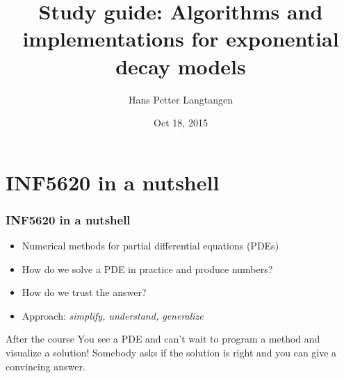 \documentclass{beamer}
\begin{document}








\title{Study guide: Algorithms and implementations for exponential decay models}


\author{Hans Petter Langtangen}

\date{Oct 18, 2015
}

\begin{frame}
\titlepage
\end{frame}

\section{INF5620 in a nutshell}

\begin{frame}
\frametitle{INF5620 in a nutshell}

\label{5620:about}

\begin{itemize}
 \item Numerical methods for partial differential equations (PDEs)

 \item How do we solve a PDE in practice and produce numbers?

 \item How do we trust the answer?

 \item Approach: \emph{simplify, understand, generalize}
\end{itemize}

\noindent
\begin{block}{After the course }
You see a PDE and can't wait to program a method
and visualize a solution! Somebody asks if the solution is right
and you can give a convincing answer.
\end{block}


\end{frame}
\end{document}
